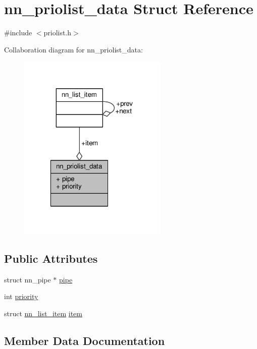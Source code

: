 \hypertarget{structnn__priolist__data}{}\section{nn\+\_\+priolist\+\_\+data Struct Reference}
\label{structnn__priolist__data}


{\ttfamily \#include $<$priolist.\+h$>$}



Collaboration diagram for nn\+\_\+priolist\+\_\+data\+:\nopagebreak
\begin{figure}[H]
\begin{center}
\leavevmode
\includegraphics[width=202pt]{structnn__priolist__data__coll__graph}
\end{center}
\end{figure}
\subsection*{Public Attributes}
\begin{DoxyCompactItemize}
\item 
struct nn\+\_\+pipe $\ast$ \hyperlink{structnn__priolist__data_ac38c3895992700941b876c2410e01f19}{pipe}
\item 
int \hyperlink{structnn__priolist__data_a2709d2e03071e27936dd1cb73aed3dbc}{priority}
\item 
struct \hyperlink{structnn__list__item}{nn\+\_\+list\+\_\+item} \hyperlink{structnn__priolist__data_ab5bead9bec69415ce75552478dba8af2}{item}
\end{DoxyCompactItemize}


\subsection{Member Data Documentation}
